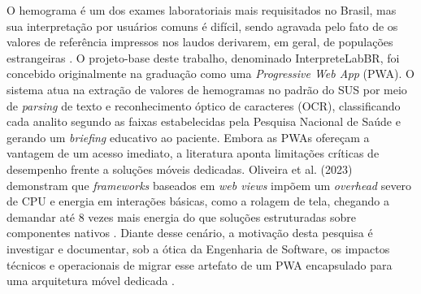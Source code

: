 \documentclass[12pt]{article}
\begin{document}
O hemograma é um dos exames laboratoriais mais requisitados no Brasil, mas sua interpretação por usuários comuns é difícil, sendo agravada pelo fato de os valores de referência impressos nos laudos derivarem, em geral, de populações estrangeiras \cite{rosenfeld2019}. O projeto-base deste trabalho, denominado InterpreteLabBR, foi concebido originalmente na graduação como uma \emph{Progressive Web App} (PWA). O sistema atua na extração de valores de hemogramas no padrão do SUS por meio de \emph{parsing} de texto e reconhecimento óptico de caracteres (OCR), classificando cada analito segundo as faixas estabelecidas pela Pesquisa Nacional de Saúde \cite{rosenfeld2019} e gerando um \emph{briefing} educativo ao paciente. Embora as PWAs ofereçam a vantagem de um acesso imediato, a literatura aponta limitações críticas de desempenho frente a soluções móveis dedicadas. Oliveira et al. (2023) demonstram que \emph{frameworks} baseados em \emph{web views} impõem um \emph{overhead} severo de CPU e energia em interações básicas, como a rolagem de tela, chegando a demandar até 8 vezes mais energia do que soluções estruturadas sobre componentes nativos \cite{oliveira2023}. Diante desse cenário, a motivação desta pesquisa é investigar e documentar, sob a ótica da Engenharia de Software, os impactos técnicos e operacionais de migrar esse artefato de um PWA encapsulado para uma arquitetura móvel dedicada \cite{oliveira2023}.
\end{document}
